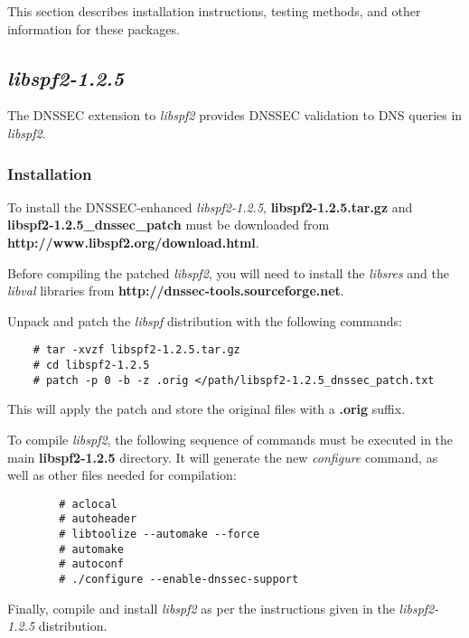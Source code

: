 \documentclass[12pt]{article}
\newcommand{\cmd}[1]{{\em #1}}
\newcommand{\lib}[1]{{\em #1}}
\newcommand{\path}[1]{{\bf #1}}
\newcommand{\url}[1]{{\bf #1}}
\begin{document}
This section describes installation instructions, testing methods, and other
information for these packages.



\subsection{\lib{libspf2-1.2.5}}

The DNSSEC extension to \lib{libspf2} provides DNSSEC validation to DNS
queries in \lib{libspf2}.


\subsubsection{Installation}

To install the DNSSEC-enhanced \lib{libspf2-1.2.5}, \path{libspf2-1.2.5.tar.gz}
and \path{libspf2-1.2.5\-\_\-dns\-sec\_\-patch} must be downloaded from
\url{http://www.libspf2.org/download.html}.

Before compiling the patched \lib{libspf2}, you will need to install the
\lib{libsres} and the \lib{libval} libraries from
\url{http://dnssec-tools.sourceforge.net}.

Unpack and patch the \lib{libspf} distribution with the following commands:

\begin{verbatim}
    # tar -xvzf libspf2-1.2.5.tar.gz
    # cd libspf2-1.2.5
    # patch -p 0 -b -z .orig </path/libspf2-1.2.5_dnssec_patch.txt
\end{verbatim}

This will apply the patch and store the original files with a \path{.orig}
suffix.

To compile \lib{libspf2}, the following sequence of commands must be executed
in the main \path{libspf2-1.2.5} directory.  It will generate the new
\cmd{configure} command, as well as other files needed for compilation:

\begin{verbatim}
        # aclocal
        # autoheader
        # libtoolize --automake --force
        # automake
        # autoconf
        # ./configure --enable-dnssec-support
\end{verbatim}

Finally, compile and install \lib{libspf2} as per the instructions given
in the \lib{libspf2-1.2.5} distribution.
\end{document}
